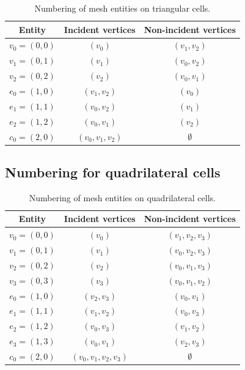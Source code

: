 \begin{table}[H]
\linespread{1.2}\selectfont
  \begin{center}
    \begin{tabular}{|c|c|c|}
      \hline
      Entity & Incident vertices & Non-incident vertices \\
      \hline
      \hline
      $v_0 = (0, 0)$ & $(v_0)$ & $(v_1, v_2)$ \\
      \hline
      $v_1 = (0, 1)$ & $(v_1)$ & $(v_0, v_2)$ \\
      \hline
      $v_2 = (0, 2)$ & $(v_2)$ & $(v_0, v_1)$ \\
      \hline
      $e_0 = (1, 0)$ & $(v_1, v_2)$ & $(v_0)$ \\
      \hline
      $e_1 = (1, 1)$ & $(v_0, v_2)$ & $(v_1)$ \\
      \hline
      $e_2 = (1, 2)$ & $(v_0, v_1)$ & $(v_2)$ \\
      \hline
      $c_0 = (2, 0)$ & $(v_0, v_1, v_2)$ & $\emptyset$ \\
      \hline
    \end{tabular}
    \caption{Numbering of mesh entities on triangular cells.}
    \label{tab:triangle,entities}
  \end{center}
\end{table}

\subsection{Numbering for quadrilateral cells}

\begin{table}[H]
\linespread{1.1}\selectfont
  \begin{center}
    \begin{tabular}{|c|c|c|}
      \hline
      Entity & Incident vertices & Non-incident vertices \\
      \hline
      \hline
      $v_0 = (0, 0)$ & $(v_0)$ & $(v_1, v_2, v_3)$ \\
      \hline
      $v_1 = (0, 1)$ & $(v_1)$ & $(v_0, v_2, v_3)$ \\
      \hline
      $v_2 = (0, 2)$ & $(v_2)$ & $(v_0, v_1, v_3)$ \\
      \hline
      $v_3 = (0, 3)$ & $(v_3)$ & $(v_0, v_1, v_2)$ \\
      \hline
      $e_0 = (1, 0)$ & $(v_2, v_3)$ & $(v_0, v_1)$ \\
      \hline
      $e_1 = (1, 1)$ & $(v_1, v_2)$ & $(v_0, v_3)$ \\
      \hline
      $e_2 = (1, 2)$ & $(v_0, v_3)$ & $(v_1, v_2)$ \\
      \hline
      $e_3 = (1, 3)$ & $(v_0, v_1)$ & $(v_2, v_3)$ \\
      \hline
      $c_0 = (2, 0)$ & $(v_0, v_1, v_2, v_3)$ & $\emptyset$ \\
      \hline
    \end{tabular}
    \caption{Numbering of mesh entities on quadrilateral cells.}
    \label{tab:quadrilateral,entities}
  \end{center}
\end{table}

